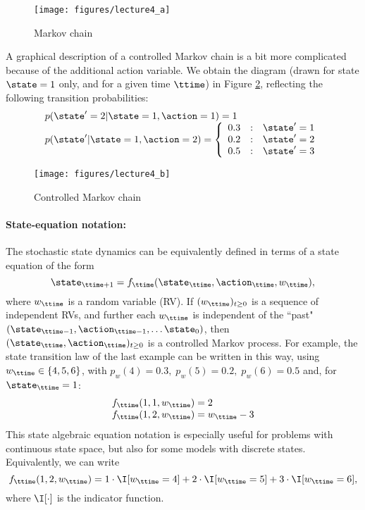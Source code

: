 \begin{figure}
  \begin{centering}
  \texttt{[image: figures/lecture4\_a]}\\
  \caption{Markov chain}\label{fig:MC}
  \end{centering}
\end{figure}

A graphical description of a controlled Markov chain is a bit more
complicated because of the additional action variable. We obtain the
diagram (drawn for state $\state = 1$ only, and for a given time
$\ttime$) in Figure \ref{fig:MDP}, reflecting the following
transition probabilities:
\[\begin{array}{l}
p(\state' = 2|\state = 1,\action = 1) = 1\\
p(\state'|\state = 1,\action = 2) = \left\{ {\begin{array}{*{20}{c}}
{0.3}&:&{\state' = 1}\\
{0.2}&:&{\state' = 2}\\
{0.5}&:&{\state' = 3}
\end{array}} \right.
\end{array}\]

\begin{figure}
  \begin{centering}
  \texttt{[image: figures/lecture4\_b]}\\
  \caption{Controlled Markov chain}\label{fig:MDP}
  \end{centering}
\end{figure}


\paragraph{State-equation notation:}
The stochastic state dynamics can be equivalently defined in terms of a state equation of the form
                                                   \[{\state_{\ttime + 1}} = {f_\ttime}({\state_\ttime},{\action_\ttime},{w_\ttime}),\]
where ${w_\ttime}$ is a random variable (RV).
    If  ${({w_\ttime})_{t \ge 0}}$ is a sequence of independent RVs, and further each ${w_\ttime}$ is independent of the ``past"  $({\state_{\ttime - 1}},{\action_{\ttime - 1}}, \ldots {\state_0})$, then ${({\state_\ttime},{\action_\ttime})_{t \ge 0}}$ is a controlled Markov process.
    For example, the state transition law of the last example can be written in this way, using
                  ${w_\ttime} \in \{ 4,5,6\} $,  with  ${p_w}(4) = 0.3,\;{p_w}(5) = 0.2,\;{p_w}(6) = 0.5$
and, for ${\state_\ttime} = 1$:
    \[\begin{array}{l}
    {f_\ttime}(1,1,{w_\ttime}) = 2\\
    {f_\ttime}(1,2,{w_\ttime}) = {w_\ttime} - 3
    \end{array}\]
  This state algebraic equation notation is especially useful for problems with continuous state space, but also for some models with discrete states.
Equivalently, we can write
    \[
 {f_\ttime}(1,2,{w_\ttime}) = 1\cdot \I[{w_\ttime}=4]+2\cdot \I[{w_\ttime}=5]+3\cdot \I[{w_\ttime}=6] ,
    \]
where $\I[\cdot]$ is the indicator function.

